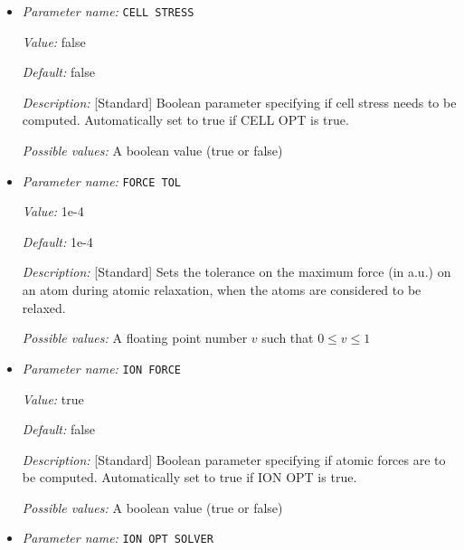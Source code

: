 \begin{itemize}
{\it Default:} LBFGS


{\it Description:} [Standard] Method for Cell relaxation solver. LBFGS is the default


{\it Possible values:} Any one of BFGS, LBFGS, CGPRP
\item {\it Parameter name:} {\tt CELL STRESS}
\label{parameters:Geometry/Optimization/CELL STRESS}
\label{parameters:Geometry/Optimization/CELL_20STRESS}


{\it Value:} false


{\it Default:} false


{\it Description:} [Standard] Boolean parameter specifying if cell stress needs to be computed. Automatically set to true if CELL OPT is true.


{\it Possible values:} A boolean value (true or false)
\item {\it Parameter name:} {\tt FORCE TOL}
\label{parameters:Geometry/Optimization/FORCE TOL}
\label{parameters:Geometry/Optimization/FORCE_20TOL}


{\it Value:} 1e-4


{\it Default:} 1e-4


{\it Description:} [Standard] Sets the tolerance on the maximum force (in a.u.) on an atom during atomic relaxation, when the atoms are considered to be relaxed.


{\it Possible values:} A floating point number $v$ such that $0 \leq v \leq 1$
\item {\it Parameter name:} {\tt ION FORCE}
\label{parameters:Geometry/Optimization/ION FORCE}
\label{parameters:Geometry/Optimization/ION_20FORCE}


{\it Value:} true


{\it Default:} false


{\it Description:} [Standard] Boolean parameter specifying if atomic forces are to be computed. Automatically set to true if ION OPT is true.


{\it Possible values:} A boolean value (true or false)
\item {\it Parameter name:} {\tt ION OPT SOLVER}
\label{parameters:Geometry/Optimization/ION OPT SOLVER}
\label{parameters:Geometry/Optimization/ION_20OPT_20SOLVER}



\end{itemize}
